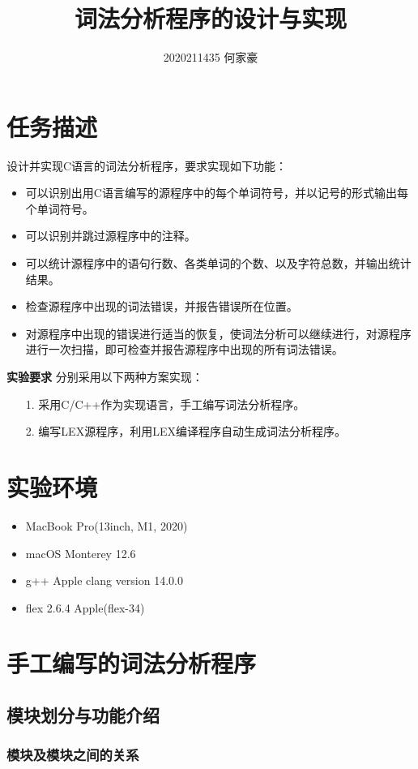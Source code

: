 \documentclass[twocolumn]{article}
\title{词法分析程序的设计与实现}
\author{2020211435 何家豪}
\begin{document}
\maketitle
\section{任务描述}
设计并实现C语言的词法分析程序，要求实现如下功能：
\begin{itemize}
	\item 可以识别出用C语言编写的源程序中的每个单词符号，并以记号的形式输出每个单词符号。
	\item 可以识别并跳过源程序中的注释。
	\item 可以统计源程序中的语句行数、各类单词的个数、以及字符总数，并输出统计结果。
	\item 检查源程序中出现的词法错误，并报告错误所在位置。
	\item 对源程序中出现的错误进行适当的恢复，使词法分析可以继续进行，对源程序进行一次扫描，即可检查并报告源程序中出现的所有词法错误。
\end{itemize}
\textbf{实验要求 }分别采用以下两种方案实现：
\begin{itemize}
	\item[1.] 采用C/C++作为实现语言，手工编写词法分析程序。
	\item[2.] 编写LEX源程序，利用LEX编译程序自动生成词法分析程序。
\end{itemize}
\section{实验环境}
\begin{itemize}
	\item MacBook Pro(13inch, M1, 2020)
	\item macOS Monterey 12.6
	\item g++ Apple clang version 14.0.0
	\item flex 2.6.4 Apple(flex-34)
\end{itemize}
\section{手工编写的词法分析程序}

\subsection{模块划分与功能介绍}

\subsubsection{模块及模块之间的关系}
\end{document}

